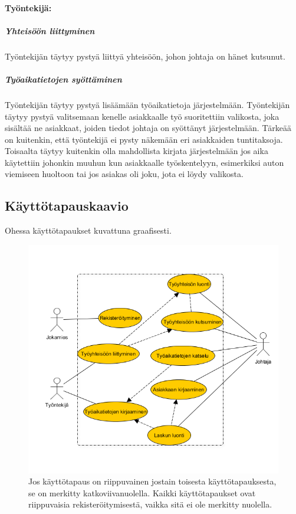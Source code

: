 \documentclass[a4paper, 12pt finnish]{article}
\begin{document}
\paragraph{Työntekijä:}
\subparagraph{Yhteisöön liittyminen} Työntekijän täytyy pystyä liittyä
yhteisöön, johon johtaja on hänet kutsunut.
\subparagraph{Työaikatietojen syöttäminen} Työntekijän täytyy pystyä
lisäämään työaikatietoja järjestelmään. Työntekijän täytyy pystyä
valitsemaan kenelle asiakkaalle työ suoritettiin valikosta, joka sisältää
ne asiakkaat, joiden tiedot johtaja on syöttänyt järjestelmään. Tärkeää
on kuitenkin, että työntekijä ei pysty näkemään eri asiakkaiden
tuntitaksoja. Toisaalta täytyy kuitenkin olla mahdollista kirjata
järjestelmään jos aika käytettiin johonkin muuhun kun asiakkaalle
työskentelyyn, esimerkiksi auton viemiseen huoltoon tai jos asiakas oli
joku, jota ei löydy valikosta.

\subsection{Käyttötapauskaavio} Ohessa käyttötapaukset kuvattuna
graafisesti.

\begin{figure}[h]
    \centering
    \includegraphics[width=1\textwidth]{graafi.png}
    \caption{\small Jos käyttötapaus on riippuvainen jostain toisesta
    käyttötapauksesta, se on merkitty katkoviivanuolella. Kaikki
käyttötapaukset ovat riippuvaisia rekisteröitymisestä, vaikka sitä
ei ole merkitty nuolella.}
\end{figure}
\newpage
\end{document}

